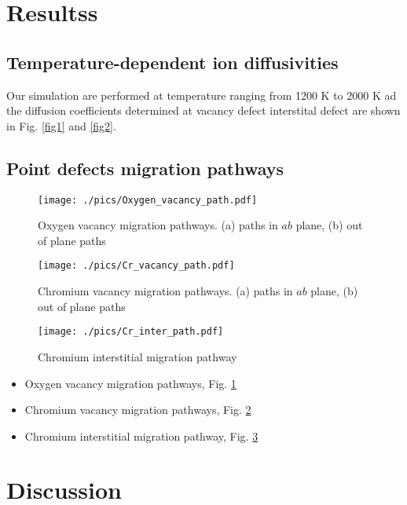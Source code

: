 \documentclass[twocolumn,showpacs,preprintnumbers,amsmath,amssymb,superscriptaddress,prb]{revtex4}
\begin{document}
\section{Resultss}
\subsection{Temperature-dependent ion diffusivities}

Our simulation are performed at temperature ranging from 1200 K to 2000 K ad the diffusion coefficients determined at vacancy defect interstital defect are shown in Fig. \ref{fig1} and \ref{fig2}.   

\subsection{Point defects migration pathways}
\begin{figure} 
	\centering
		\texttt{[image: ./pics/Oxygen\_vacancy\_path.pdf]}
	\caption{Oxygen vacancy migration pathways. (a) paths in $ab$ plane, (b) out of plane paths }
	\label{fig5} 
\end{figure}
\begin{figure} 
	\centering
		\texttt{[image: ./pics/Cr\_vacancy\_path.pdf]}
	\caption{Chromium vacancy migration pathways. (a) paths in $ab$ plane, (b) out of plane paths }
	\label{fig6} 
\end{figure}

\begin{figure} 
	\centering
		\texttt{[image: ./pics/Cr\_inter\_path.pdf]}
	\caption{Chromium interstitial migration pathway}
	\label{fig7} 
\end{figure}


\begin{itemize}
	\item Oxygen vacancy migration pathways, Fig. \ref{fig5} 
	\item Chromium vacancy migration pathways, Fig. \ref{fig6}  
	\item Chromium interstitial migration pathway, Fig. \ref{fig7}   
\end{itemize}



\section{Discussion}
\end{document}
